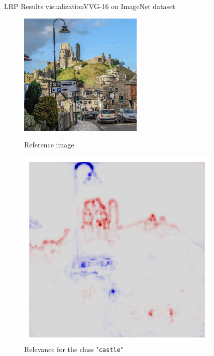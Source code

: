 \documentclass[aspectratio=169]{beamer}
\theoremstyle{definition}
\begin{document}
\begin{frame}{LRP Results visualization}{VVG-16 on ImageNet dataset}
    \begin{figure}[ht]
        \begin{minipage}[c]{0.45\linewidth}
            \centering
            \includegraphics[width=.8\textwidth]{castle.jpg}
            \caption{Reference image}
        \end{minipage}
        \hspace{0.25cm}
        \begin{minipage}[c]{0.45\linewidth}
            \centering
            \includegraphics[width=.8\textwidth]{castle-lrp.png}
            \caption{Relevance for the class "\texttt{castle}"}
        \end{minipage}
    \end{figure}
\end{frame}
\end{document}
